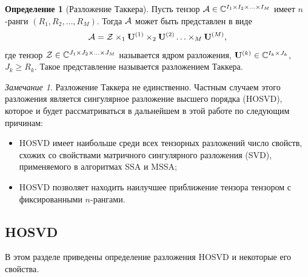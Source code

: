 \documentclass[specialist,
  substylefile=spbu_report.rtx,
subf,href,colorlinks=true, 12pt]{disser}
\theoremstyle{plain}
\theoremstyle{definition}
\newtheorem{definition}{Определение}[section]
\theoremstyle{remark}
\newtheorem*{remark}{Замечание}
\begin{document}
\begin{definition}[Разложение Таккера]
  Пусть тензор $\mathcal{A} \in \mathbb{C}^{I_1 \times I_2 \times \ldots \times I_M}$ имеет $n$-ранги
  $(R_1, R_2, \ldots, R_M)$.
  Тогда $\mathcal{A}$ может быть представлен в виде
  \begin{equation}
    \label{eq:tucker-decomp}
    \mathcal{A} = \mathcal{Z} \times_1 \mathbf{U}^{(1)} \times_2 \mathbf{U}^{(2)} \ldots \times_M \mathbf{U}^{(M)},
  \end{equation}
  где тензор $\mathcal{Z} \in \mathbb{C}^{J_1 \times J_2 \times \ldots \times J_M}$ называется ядром разложения,
  $\mathbf{U}^{(k)} \in \mathbb{C}^{I_k \times J_k}$, $J_k \geqslant R_k$.
  Такое представление называется разложением Таккера.
\end{definition}

\begin{remark}
  Разложение Таккера не единственно.
  Частным случаем этого разложения является сингулярное разложение высшего порядка (HOSVD),
  которое и будет рассматриваться в дальнейшем в этой работе по следующим причинам:
  \begin{itemize}
    \item HOSVD имеет наибольше среди всех тензорных разложений
      число свойств, схожих со свойствами матричного сингулярного разложения (SVD),
      применяемого в алгоритмах SSA и MSSA;
    \item HOSVD позволяет находить наилучшее приближение тензора тензором с
      фиксированными $n$-рангами.
  \end{itemize}
\end{remark}

\subsection{HOSVD}\label{subsec:hosvd}
В этом разделе приведены определение разложения HOSVD и некоторые его свойства.

\end{document}
